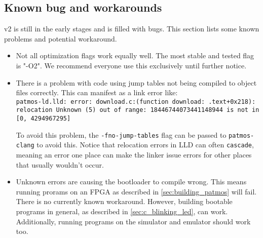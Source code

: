 \subsection{Known bug and workarounds}

v2 is still in the early stages and is filled with bugs.
This section lists some known problems and potential workaround.

\begin{itemize}
	\item Not all optimization flags work equally well.
		The most stable and tested flag is "-O2". We recommend everyone use this exclusively until further notice.
		
	\item There is a problem with code using jump tables not being compiled to object files correctly.
		This can manifest as a link error like: \\
		\texttt{patmos-ld.lld: error: download.c:(function download: .text+0x218): relocation Unknown (5) out of range: 18446744073441148944 is not in [0, 4294967295]}
		
		To avoid this problem, the \texttt{-fno-jump-tables} flag can be passed to \texttt{patmos-clang} to avoid this.
		Notice that relocation errors in LLD can often \texttt{cascade}, meaning an error one place can make the linker issue errors for other places that usually wouldn't occur.
		
	\item Unknown errors are causing the bootloader to compile wrong.
		This means running prorams on an FPGA as described in \autoref{sec:building_patmos} will fail.
		There is no currently known workaround.
		However, building bootable programs in general, as described in \autoref{sec:c_blinking_led}, can work.
		Additionally, running programs on the simulator and emulator should work too.
\end{itemize}

